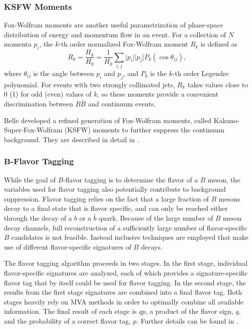 \subsubsection{KSFW Moments}
Fox-Wolfram moments are another useful parametrization of phase-space distribution of energy and momentum flow in an event. For a collection of $N$ momenta $p_i$, the $k$-th order normalized Fox-Wolfram moment $R_k$ is defined as
\begin{equation}
R_k = \frac{H_k}{H_0} = \frac{1}{H_0} \sum_{i,j} \vert p_i \vert \vert p_j \vert P_k(\cos \theta_{ij}),
\end{equation}
where $\theta_{ij}$ is the angle between $p_i$ and $p_j$, and $P_k$ is the $k$-th order Legendre polynomial. For events with two strongly collimated jets, $R_k$ takes values close to 0 (1) for odd (even) values of $k$, so these moments provide a convenient discrimination between $B \bar B$ and continuum events.

Belle developed a refined generation of Fox-Wolfram moments, called Kakuno-Super-Fox-Wolfram (KSFW) moments to further suppress the continuum background. They are described in detail in \cite{bevan2014physics}.

\subsubsection{\texorpdfstring{$\bm{B}$-Flavor Tagging}{B-Flavor Tagging}}
While the goal of $B$-flavor tagging is to determine the flavor of a $B$ meson, the variables used for flavor tagging also potentially contribute to background suppression. Flavor tagging relies on the fact that a large fraction of $B$ mesons decay to a final state that is flavor specific, and can  only  be   reached  either through the decay of a $b$ or a $\bar b$ quark. Because  of  the  large  number  of $B$ meson decay  channels, full reconstruction of a sufficiently large number of flavor-specific $B$ candidates  is  not  feasible. Instead  inclusive  techniques  are  employed  that  make  use  of  different
flavor-specific signatures of $B$ decays. 

The flavor tagging algorithm proceeds in two stages. In the first stage, individual flavor-specific signatures are analyzed, each of which provides a signature-specific flavor tag that by itself could be used  for  flavor  tagging.  In  the  second  stage,  the  results from the first stage signatures are combined into a final flavor  tag.  Both  stages  heavily rely on MVA  methods in order to optimally combine all available information. The final result of each stage is $qp$, a product of the flavor sign, $q$, and the probability of a correct flavor tag, $p$. Further details can be found in \cite{bevan2014physics}.

